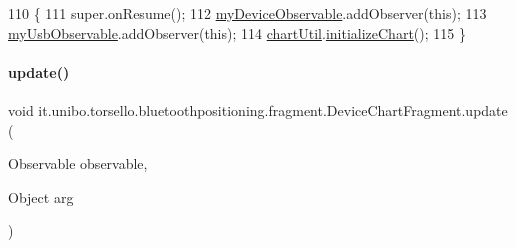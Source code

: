 \begin{DoxyCode}
110                            \{
111         super.onResume();
112         \hyperlink{classit_1_1unibo_1_1torsello_1_1bluetoothpositioning_1_1fragment_1_1DeviceChartFragment_a82756c59ac344db249e6cebcec3d1835_a82756c59ac344db249e6cebcec3d1835}{myDeviceObservable}.addObserver(\textcolor{keyword}{this});
113         \hyperlink{classit_1_1unibo_1_1torsello_1_1bluetoothpositioning_1_1fragment_1_1DeviceChartFragment_aa9e0527dce7ccc3e51afe698a76f2faf_aa9e0527dce7ccc3e51afe698a76f2faf}{myUsbObservable}.addObserver(\textcolor{keyword}{this});
114         \hyperlink{classit_1_1unibo_1_1torsello_1_1bluetoothpositioning_1_1fragment_1_1DeviceChartFragment_ad28ad16d89e075ea2e572bba9b24bc4e_ad28ad16d89e075ea2e572bba9b24bc4e}{chartUtil}.\hyperlink{classit_1_1unibo_1_1torsello_1_1bluetoothpositioning_1_1util_1_1ChartUtil_aab1a6bd41cbf8228c53d633af6b89bb7_aab1a6bd41cbf8228c53d633af6b89bb7}{initializeChart}();
115     \}
\end{DoxyCode}
\hypertarget{classit_1_1unibo_1_1torsello_1_1bluetoothpositioning_1_1fragment_1_1DeviceChartFragment_a879725f924473013057be7f3aaea2ab0_a879725f924473013057be7f3aaea2ab0}{}\label{classit_1_1unibo_1_1torsello_1_1bluetoothpositioning_1_1fragment_1_1DeviceChartFragment_a879725f924473013057be7f3aaea2ab0_a879725f924473013057be7f3aaea2ab0} 
\paragraph{\texorpdfstring{update()}{update()}}
{\footnotesize\ttfamily void it.\+unibo.\+torsello.\+bluetoothpositioning.\+fragment.\+Device\+Chart\+Fragment.\+update (\begin{DoxyParamCaption}\item[{Observable}]{observable,  }\item[{Object}]{arg }\end{DoxyParamCaption})}


